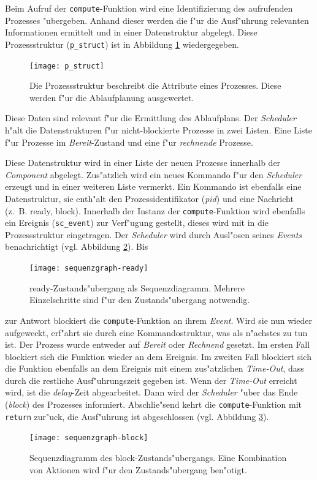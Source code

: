 Beim Aufruf der \verb|compute|-Funktion wird eine Identifizierung des
aufrufenden Prozesses "ubergeben. Anhand dieser werden die f"ur die Ausf"uhrung
relevanten Informationen ermittelt und in einer Datenstruktur abgelegt. Diese
Prozessstruktur (\verb|p_struct|) ist in Abbildung 
\ref{fig:p_struct}
wiedergegeben.
\begin{figure}
\begin{center}
\texttt{[image: p\_struct]}
\caption{Die Prozessstruktur beschreibt die Attribute eines Prozesses. Diese
  werden f"ur die Ablaufplanung ausgewertet.}
\label{fig:p_struct}
\end{center}
\end{figure}
Diese Daten sind relevant f"ur die Ermittlung des Ablaufplans. Der
\emph{Scheduler} h"alt die Datenstrukturen f"ur nicht-blockierte Prozesse in
zwei Listen. Eine Liste f"ur Prozesse im \emph{Bereit}-Zustand und eine f"ur
\emph{rechnende} Prozesse.

Diese Datenstruktur wird in einer Liste der neuen Prozesse innerhalb der
\emph{Component} abgelegt. Zus"atzlich wird ein neues Kommando f"ur den
\emph{Scheduler} erzeugt und in einer weiteren Liste vermerkt. Ein Kommando
ist ebenfalls eine Datenstruktur, sie enth"alt den Prozessidentifikator
(\emph{pid}) und eine Nachricht (z.~B. ready, block). Innerhalb der Instanz der
\verb|compute|-Funktion wird ebenfalls ein Ereignis (\verb|sc_event|) zur Verf"ugung
gestellt, dieses wird mit in die Prozessstruktur eingetragen. Der
\emph{Scheduler} wird durch Ausl"osen seines \emph{Events} benachrichtigt
(vgl. Abbildung \ref{fig:seq-ready}). Bis
\begin{figure}
\begin{center}
\texttt{[image: sequenzgraph-ready]}
\caption{ready-Zustands"ubergang als Sequenzdiagramm. Mehrere Einzelschritte
  sind f"ur den Zustands"ubergang notwendig.}
\label{fig:seq-ready}
\end{center}
\end{figure}
zur Antwort blockiert die \verb|compute|-Funktion an ihrem \emph{Event}. Wird
sie nun wieder aufgeweckt, erf"ahrt sie durch eine Kommandostruktur, was als
n"achstes zu tun ist. Der Prozess wurde entweder auf \emph{Bereit} oder
\emph{Rechnend} gesetzt. Im ersten Fall blockiert sich die Funktion wieder an
dem Ereignis. Im zweiten Fall blockiert sich die Funktion ebenfalls an dem
Ereignis mit einem zus"atzlichen \emph{Time-Out}, dass durch die restliche
Ausf"uhrungszeit gegeben ist. Wenn der \emph{Time-Out} erreicht wird, ist die
\emph{delay}-Zeit abgearbeitet. Dann wird der \emph{Scheduler} "uber das Ende
(\emph{block}) des Prozesses informiert. Abschlie"send kehrt die
\verb|compute|-Funktion mit \verb|return| zur"uck, die Ausf"uhrung ist
abgeschlossen (vgl. Abbildung \ref{fig:seq-block}).
\begin{figure}
\begin{center}
\texttt{[image: sequenzgraph-block]}
\caption{Sequenzdiagramm des block-Zustands"ubergangs. Eine Kombination von
  Aktionen wird f"ur den Zustands"ubergang ben"otigt.}
\label{fig:seq-block}
\end{center}
\end{figure}


